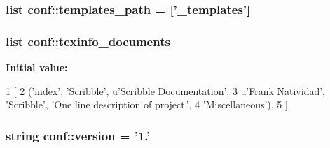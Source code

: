 \hypertarget{namespaceconf_af50129dcc1f90655539f025595a3093b}{
\subsubsection[{templates\-\_\-path}]{\setlength{\rightskip}{0pt plus 5cm}list {\bf conf\-::templates\-\_\-path} = \mbox{[}'\-\_\-templates'\mbox{]}}}\label{namespaceconf_af50129dcc1f90655539f025595a3093b}
\hypertarget{namespaceconf_a22cc2d5df880ae78ca10c4675b494602}{
\subsubsection[{texinfo\-\_\-documents}]{\setlength{\rightskip}{0pt plus 5cm}list {\bf conf\-::texinfo\-\_\-documents}}}\label{namespaceconf_a22cc2d5df880ae78ca10c4675b494602}
{\bfseries \-Initial value\-:}
\begin{DoxyCode}
1 [
2   ('index', 'Scribble', u'Scribble Documentation',
3    u'Frank Natividad', 'Scribble', 'One line description of project.',
4    'Miscellaneous'),
5 ]
\end{DoxyCode}
\hypertarget{namespaceconf_a93370314d5e59e93dabf67ca4906c634}{
\subsubsection[{version}]{\setlength{\rightskip}{0pt plus 5cm}string {\bf conf\-::version} = '1.'}}\label{namespaceconf_a93370314d5e59e93dabf67ca4906c634}
